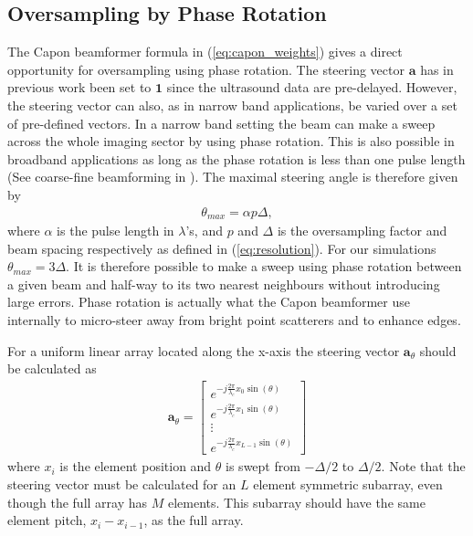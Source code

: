 \documentclass[journal]{IEEEtran}
\renewcommand{\vec}[1]{\mathbf{#1}}
\begin{document}
\subsection{Oversampling by Phase Rotation}
The Capon beamformer formula in (\ref{eq:capon_weights}) gives a direct opportunity for oversampling using phase rotation. The steering vector $\vec{a}$ has in previous work been set to $\vec{1}$ since the ultrasound data are pre-delayed. However, the steering vector can also, as in narrow band applications, be varied over a set of pre-defined vectors. In a narrow band setting the beam can make a sweep across the whole imaging sector by using phase rotation. This is also possible in broadband applications as long as the phase rotation is less than one pulse length (See coarse-fine beamforming in \cite{Thomenius}). The maximal steering angle is therefore given by
\begin{align}
\theta_{max} = \alpha p \Delta,
\end{align}
where $\alpha$ is the pulse length in $\lambda$'s, and $p$ and $\Delta$ is the oversampling factor and beam spacing respectively as defined in (\ref{eq:resolution}). For our simulations $\theta_{max} = 3\Delta$.
It is therefore possible to make a sweep using phase rotation between a given beam and half-way to its two nearest neighbours without introducing large errors. Phase rotation is actually what the Capon beamformer use internally to micro-steer away from bright point scatterers and to enhance edges.

For a uniform linear array located along the x-axis the steering vector $\vec{a}_\theta$ should be calculated as 
\begin{align}
\vec{a}_\theta = 
\begin{bmatrix}
e^{-j\frac{2\pi}{\lambda_c}x_0\sin(\theta)} \\
e^{-j\frac{2\pi}{\lambda_c}x_1\sin(\theta)} \\
\vdots \\ 
e^{-j\frac{2\pi}{\lambda_c}x_{L-1}\sin(\theta)}
\end{bmatrix}
\end{align}
where $x_i$ is the element position and $\theta$ is swept from $-\Delta/2$ to $\Delta/2$. Note that the steering vector must be calculated for an $L$ element symmetric subarray, even though the full array has $M$ elements. This subarray should have the same element pitch, $x_i - x_{i-1}$, as the full array. %
\end{document}
